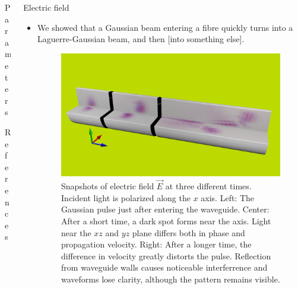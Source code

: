 \documentclass{beamer}
\newlength{\wideitemsep}
\let\olditem\item
\renewcommand{\item}{\setlength{\itemsep}{\wideitemsep}\olditem}
\newcommand{\blockpadding}{
  \rule[-0.6ex]{0pt}{2.5ex}
}
\begin{document}
\begin{columns}[t]
\begin{column}{.36\textwidth}
\begin{block}{\blockpadding Parameters}
\begin{itemize}
 \end{itemize}
 \end{block}
 
 \begin{block}{\blockpadding References}
  
 \end{block}


 \end{column}
 
 \begin{column}{0.596\textwidth}
  \begin{block}{\blockpadding Electric field}
  \begin{itemize}
   \item We showed that a Gaussian beam entering a fibre quickly turns into a Laguerre-Gaussian beam, and then [into something else]. 
\begin{figure}[h]
\centering
 \includegraphics[width=.825\textwidth,clip,trim=0mm 50mm 0mm 80mm]{./render}
 \caption{Snapshots of electric field $\vec E$ at three different times. Incident light is polarized along the $x$ axis. {\color{dark} Left:} The Gaussian pulse just after entering the waveguide. {\color{dark} Center:} After a short time, a dark spot forms near the axis. Light near the $xz$ and $yz$ plane differs both in phase and propagation velocity. {\color{dark} Right:} After a longer time, the difference in velocity greatly distorts the pulse. Reflection from waveguide walls causes noticeable interferrence and waveforms lose clarity, although the pattern remains visible. }
\end{figure}
\end{itemize}


\end{block}
\end{column}
\end{columns}
\end{document}
